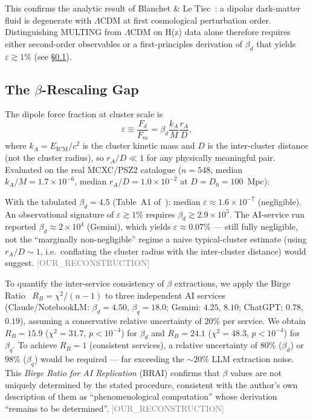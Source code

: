 \documentclass[twocolumn,prd,amsmath,amssymb,floatfix]{revtex4-2}
\newcommand{\reconstruction}{\textcolor{gray}{\small[OUR\_RECONSTRUCTION]}}
\begin{document}
This confirms the analytic result of Blanchet \& Le Tiec~\cite{blanchet2008,blanchet2009}:
a dipolar dark-matter fluid is degenerate with $\Lambda$CDM at first
cosmological perturbation order.
Distinguishing MULTING from $\Lambda$CDM on H(z) data alone therefore requires
either second-order observables or a first-principles derivation of $\beta_d$
that yields $\varepsilon \gtrsim 1\%$ (see \S\ref{ssec:beta}).

\subsection{The $\beta$-Rescaling Gap}
\label{ssec:beta}

The dipole force fraction at cluster scale is
\begin{equation}
    \varepsilon \equiv \frac{F_d}{F_m} = \beta_d \frac{k_A}{M} \frac{r_A}{D},
    \label{eq:epsilon}
\end{equation}
where $k_A = E_\mathrm{ICM}/c^2$ is the cluster kinetic mass and $D$ is the
inter-cluster distance (not the cluster radius), so $r_A/D \ll 1$ for any
physically meaningful pair. Evaluated on the real MCXC/PSZ2 catalogue
($n=548$, median $k_A/M = 1.7\times10^{-6}$, median
$r_A/D = 1.0\times10^{-2}$ at $D=D_0=100$~Mpc):

With the tabulated $\beta_d = 4.5$ (Table~A1 of~\cite{buckholtz2026}):
median $\varepsilon \approx 1.6 \times 10^{-7}$ (negligible). An observational
signature of $\varepsilon \gtrsim 1\%$ requires $\beta_d \gtrsim 2.9 \times 10^5$.
The AI-service run reported $\beta_d \approx 2\times10^4$ (Gemini), which yields
$\varepsilon \approx 0.07\%$ --- still fully negligible, not the ``marginally
non-negligible'' regime a naive typical-cluster estimate (using $r_A/D\sim1$,
i.e.\ conflating the cluster radius with the inter-cluster distance) would
suggest.
\reconstruction

To quantify the inter-service consistency of $\beta$ extractions, we apply the
Birge Ratio~\cite{birge1932} $R_B = \chi^2/(n-1)$ to three independent AI services
(Claude/NotebookLM: $\beta_d = 4.50$, $\beta_q = 18.0$;
Gemini: $4.25$, $8.10$; ChatGPT: $0.78$, $0.19$),
assuming a conservative relative uncertainty of $20\%$ per service.
We obtain $R_B = 15.9$ ($\chi^2 = 31.7$, $p < 10^{-4}$) for $\beta_d$ and
$R_B = 24.1$ ($\chi^2 = 48.3$, $p < 10^{-4}$) for $\beta_q$.
To achieve $R_B = 1$ (consistent services), a relative uncertainty of $80\%$
($\beta_d$) or $98\%$ ($\beta_q$) would be required --- far exceeding
the $\sim 20\%$ LLM extraction noise.
This \emph{Birge Ratio for AI Replication} (BRAI) confirms that $\beta$ values
are not uniquely determined by the stated procedure, consistent with the
author's own description of them as ``phenomenological computation''
whose derivation ``remains to be determined''.
\reconstruction
\end{document}
